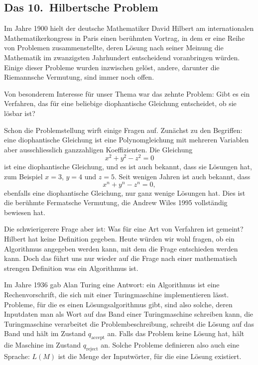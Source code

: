 \subsection{Das 10.~Hilbertsche Problem}
Im Jahre 1900 hielt der deutsche Mathematiker David Hilbert am
internationalen Mathematikerkongress in Paris einen berühmten Vortrag,
in dem er eine Reihe von Problemen zusammenstellte, deren Lösung
nach seiner Meinung die Mathematik im zwanzigsten Jahrhundert
entscheidend voranbringen würden. Einige dieser Probleme wurden
inzwischen gelöst, andere, darunter die Riemannsche Vermutung,
sind immer noch offen.

Von besonderem Interesse für unser Thema war das zehnte Problem:
Gibt es ein Verfahren, das für eine beliebige diophantische Gleichung
entscheidet, ob sie lösbar ist?

Schon die Problemstellung wirft einige Fragen auf.
Zunächst zu den Begriffen:
eine diophantische Gleichung ist eine
Polynomgleichung mit mehreren Variablen aber ausschliesslich
ganzzahligen Koeffizienten. Die Gleichung
\[
x^2+y^2-z^2=0
\]
ist eine diophantische Gleichung, und es ist auch bekannt, dass sie
Lösungen hat, zum Beispiel $x=3$, $y=4$ und $z=5$. Seit wenigen
Jahren ist auch bekannt, dass
\[
x^n+y^n-z^n=0,
\]
ebenfalls eine diophantische Gleichung, nur ganz wenige Lösungen hat.
Dies ist die berühmte Fermatsche Vermutung, die Andrew Wiles 1995
vollständig bewiesen hat.

Die schwierigerere Frage aber ist: Was für eine Art von Verfahren
ist gemeint? Hilbert hat keine Definition gegeben. Heute würden
wir wohl fragen, ob ein Algorithmus angegeben werden kann, mit dem
die Frage entschieden werden kann. Doch das führt uns nur wieder
auf die Frage nach einer  mathematisch strengen Definition was
ein Algorithmus ist.

Im Jahre 1936 gab Alan Turing eine Antwort: ein Algorithmus ist eine
Rechenvorschrift, die sich mit einer Turingmaschine implementieren
lässt. Probleme, für die es einen Lösungsalgorithmus gibt, sind
also solche, deren Inputdaten man als Wort auf das Band einer
Turingmaschine schreiben kann, die Turingmaschine verarbeitet die
Problembeschreibung, schreibt die Lösung auf das Band und hält im
Zustand $q_{\text{accept}}$ an. Falls das Problem keine Lösung hat,
hält die Maschine im Zustand $q_{\text{reject}}$ an. Solche
Probleme definieren also auch eine Sprache: $L(M)$ ist die
Menge der Inputwörter, für die eine Lösung existiert.

